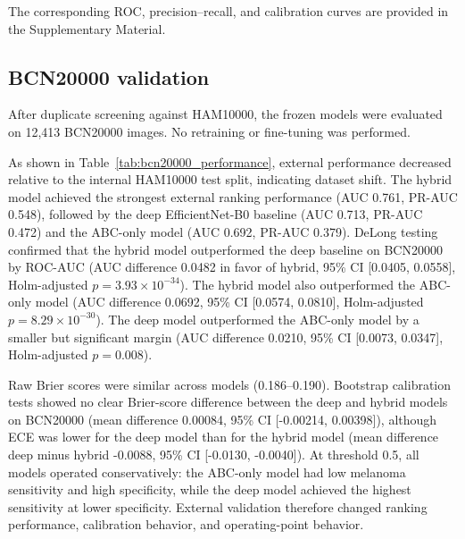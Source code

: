 \documentclass[preprint,12pt]{elsarticle}
\begin{document}
The corresponding ROC, precision--recall, and calibration curves are provided in the Supplementary Material.

\subsection{BCN20000 validation}

After duplicate screening against HAM10000, the frozen models were evaluated on 12,413 BCN20000 images. No retraining or fine-tuning was performed.

As shown in Table~\ref{tab:bcn20000_performance}, external performance decreased relative to the internal HAM10000 test split, indicating dataset shift. The hybrid model achieved the strongest external ranking performance (AUC 0.761, PR-AUC 0.548), followed by the deep EfficientNet-B0 baseline (AUC 0.713, PR-AUC 0.472) and the ABC-only model (AUC 0.692, PR-AUC 0.379). DeLong testing confirmed that the hybrid model outperformed the deep baseline on BCN20000 by ROC-AUC (AUC difference 0.0482 in favor of hybrid, 95\% CI [0.0405, 0.0558], Holm-adjusted $p=3.93\times10^{-34}$). The hybrid model also outperformed the ABC-only model (AUC difference 0.0692, 95\% CI [0.0574, 0.0810], Holm-adjusted $p=8.29\times10^{-30}$). The deep model outperformed the ABC-only model by a smaller but significant margin (AUC difference 0.0210, 95\% CI [0.0073, 0.0347], Holm-adjusted $p=0.008$).

Raw Brier scores were similar across models (0.186--0.190). Bootstrap calibration tests showed no clear Brier-score difference between the deep and hybrid models on BCN20000 (mean difference 0.00084, 95\% CI [-0.00214, 0.00398]), although ECE was lower for the deep model than for the hybrid model (mean difference deep minus hybrid -0.0088, 95\% CI [-0.0130, -0.0040]). At threshold 0.5, all models operated conservatively: the ABC-only model had low melanoma sensitivity and high specificity, while the deep model achieved the highest sensitivity at lower specificity. External validation therefore changed ranking performance, calibration behavior, and operating-point behavior.

\begin{table}[htbp]
\centering
\caption{Independent BCN20000 external validation after duplicate screening. Threshold = 0.5.}
\label{tab:bcn20000_performance}
\end{table}
\end{document}
